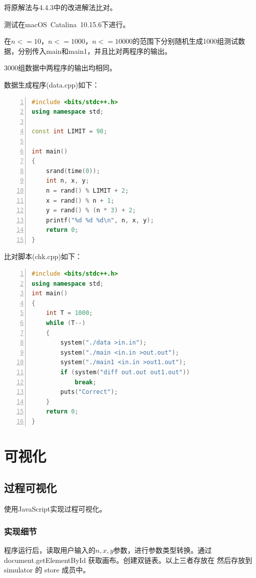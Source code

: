 \documentclass{article}
\begin{document}
将原解法与4.4.3中的改进解法比对。

测试在macOS\ Catalina\ 10.15.6下进行。

在$n<=10$，$n<=1000$，$n<=10000$的范围下分别随机生成1000组测试数据，分别传入main和main1，并且比对两程序的输出。

3000组数据中两程序的输出均相同。

数据生成程序(data.cpp)如下：

\begin{lstlisting}[language={C++},
    numbers=left,
    numberstyle=\tiny\menlo,
    basicstyle=\small\menlo]
#include <bits/stdc++.h>
using namespace std;

const int LIMIT = 98;

int main()
{
    srand(time(0));
    int n, x, y;
    n = rand() % LIMIT + 2;
    x = rand() % n + 1;
    y = rand() % (n * 3) + 2;
    printf("%d %d %d\n", n, x, y);
    return 0;
}
\end{lstlisting}

比对脚本(chk.cpp)如下：

\begin{lstlisting}[language={C++},
    numbers=left,
    numberstyle=\tiny\menlo,
    basicstyle=\small\menlo]
#include <bits/stdc++.h>
using namespace std;
int main()
{
    int T = 1000;
    while (T--)
    {
        system("./data >in.in");
        system("./main <in.in >out.out");
        system("./main1 <in.in >out1.out");
        if (system("diff out.out out1.out"))
            break;
        puts("Correct");
    }
    return 0;
}
\end{lstlisting}

\section{可视化}

\subsection{过程可视化}

使用JavaScript实现过程可视化。

\subsubsection{实现细节}

程序运行后，读取用户输入的$n, x, y$参数，进行参数类型转换。通过  document.getElementById 获取画布。创建双链表。以上三者存放在 然后存放到 simulator 的 store 成员中。
\end{document}
